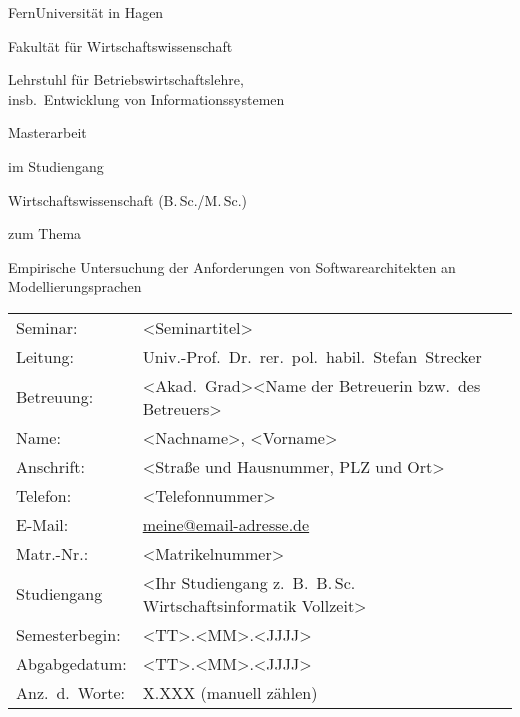 \documentclass[%
draft=false,%
paper=a4,%
fontsize=12pt,%
pagesize=auto,%
twoside=false,%
headings=small,openany,%
chapterprefix=false,%
version=last,%
titlepage=true,%
parskip=half+,%
mpinclude=false,%
headsepline=true,%
numbers=noendperiod%
]{scrbook}
\makeatletter
\newcommand{\MSc}{M.\,Sc.\@\xspace}
\newcommand{\BSc}{B.\,Sc.\@\xspace}
\makeatother
\begin{document}
\frontmatter

\begin{titlepage}
\thispagestyle{empty}

\begin{center}
	\noindent\Huge FernUniversität in Hagen
	
	\bigskip
	
	\noindent\huge Fakultät für Wirtschaftswissenschaft
	
	\bigskip
	
	\noindent\normalsize Lehrstuhl für Betriebswirtschaftslehre,\\
	\noindent\normalsize insb.\ Entwicklung von Informationssystemen
	
	\vspace{3cm}
	
	\noindent\normalsize  Masterarbeit
	
	\smallskip
	
	\noindent\normalsize im Studiengang
	
	\smallskip
	
	\noindent\normalsize  Wirtschaftswissenschaft (\BSc/\MSc)
	
	\smallskip
	
	\noindent\normalsize zum Thema
	
	\bigskip
		
	\begin{shaded}
		\centering Empirische Untersuchung der Anforderungen von Softwarearchitekten an Modellierungsprachen
	\end{shaded}	
	
	\vspace{2cm}
\end{center}

	\begin{tabular}{ll}
		Seminar:	&	<Seminartitel> \\
		Leitung:	&	Univ.-Prof.\ Dr.\ rer.\ pol.\ habil.\ Stefan~Strecker \\
		Betreuung:  &	<Akad.\ Grad><Name der Betreuerin bzw.\ des Betreuers>\\
		Name:		&	<Nachname>, <Vorname>\\
		Anschrift:	&	<Straße und Hausnummer, PLZ und Ort>\\
		Telefon:	&	<Telefonnummer>\\
		E-Mail:		&	\href{mailto:meine@email-adresse.de}{meine@email-adresse.de}\\
		Matr.-Nr.:	& 	<Matrikelnummer>\\
		Studiengang	&	<Ihr Studiengang z.\ B.\ \BSc Wirtschaftsinformatik Vollzeit>\\
		Semesterbegin:	&	<TT>.<MM>.<JJJJ> \\
		Abgabgedatum:	&	<TT>.<MM>.<JJJJ> \\
		Anz.\ d.\ Worte:	&	X.XXX (manuell zählen)\\	
	\end{tabular}
	


\end{titlepage}
\end{document}
